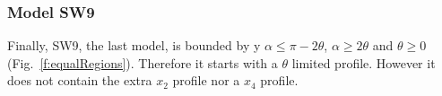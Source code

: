 \subsubsection{Model SW9} \label{SW9}

Finally, SW9, the last model, is bounded by y $\alpha \le \pi - 2\theta$, $\alpha \ge 2\theta$ and $\theta \ge 0$ (Fig.~\ref{f:equalRegions}). Therefore it starts with a $\theta$ limited profile. However it does not contain the extra $x_2$ profile nor a $x_4$ profile.








